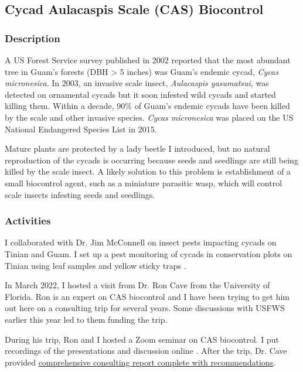 \subsection{Cycad Aulacaspis Scale (CAS) Biocontrol}
\label{CASbiocontrol}
\begin{refsection}

\subsubsection{Description}

A US Forest Service survey published in 2002 reported that the most
abundant tree in Guam's forests (DBH > 5 inches) was Guam's endemic
cycad, \emph{Cycas micronesica}. In 2003, an invasive scale insect,
\emph{Aulacaspis yasumatsui}, was detected on ornamental cycads but
it soon infested wild cycads and started killing them. Within a decade,
90\% of Guam\textquoteright s endemic cycads have been killed by the
scale and other invasive species. \emph{Cycas micronesica} was placed
on the US National Endangered Species List in 2015.

Mature plants are protected by a lady beetle I introduced, but no
natural reproduction of the cycads is occurring because seeds and seedlings are
still being killed by the scale insect. A likely solution to this
problem is establishment of a small biocontrol agent, such as a miniature
parasitic wasp, which will control scale insects infesting seeds and
seedlings.

\subsubsection{Activities}

I collaborated with Dr. Jim McConnell on insect pests impacting cycads on Tinian and Guam. I set up a pest monitoring of cycads in conservation plots on Tinian using leaf samples \cite{moore_monitoring_2022} and yellow sticky traps \cite{moore_monitoring_2022-1}.

In March 2022, I hosted a visit from Dr. Ron Cave from the University of Florida. Ron is an expert on CAS biocontrol and I have been trying to get him out here on a consulting trip for several years. Some discussions with USFWS earlier this year led to them funding the trip.

During his trip, Ron and I hosted a Zoom seminar on CAS biocontrol. I put recordings of the presentations and discussion online \cite{cave_biological_2022-1}. After the trip, Dr. Cave provided \href{https://github.com/aubreymoore/CAS-biocontrol-seminar/raw/main/Cave-CAS-report-2022.pdf}{comprehensive consulting report complete with recommendations}. 


\end{refsection}

